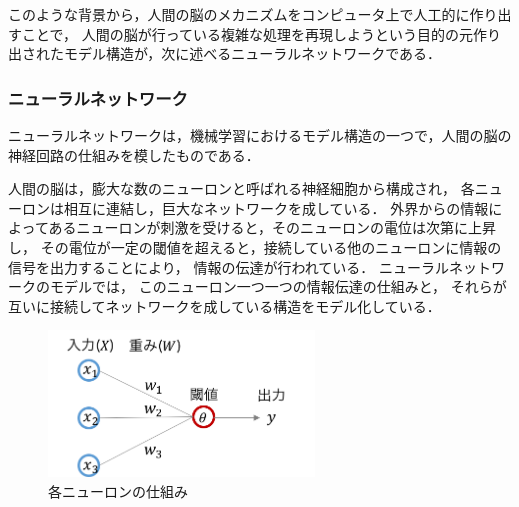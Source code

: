 このような背景から，人間の脳のメカニズムをコンピュータ上で人工的に作り出すことで，
人間の脳が行っている複雑な処理を再現しようという目的の元作り出されたモデル構造が，次に述べるニューラルネットワークである．


\subsubsection{ニューラルネットワーク}
ニューラルネットワークは，機械学習におけるモデル構造の一つで，人間の脳の神経回路の仕組みを模したものである．

人間の脳は，膨大な数のニューロンと呼ばれる神経細胞から構成され，
各ニューロンは相互に連結し，巨大なネットワークを成している．
外界からの情報によってあるニューロンが刺激を受けると，そのニューロンの電位は次第に上昇し，
その電位が一定の閾値を超えると，接続している他のニューロンに情報の信号を出力することにより，
情報の伝達が行われている．
ニューラルネットワークのモデルでは，
このニューロン一つ一つの情報伝達の仕組みと，
それらが互いに接続してネットワークを成している構造をモデル化している．

\begin{figure}[htb]
\begin{center}
\includegraphics[width=200pt]{./img/neuron.png}
\end{center}
\caption{各ニューロンの仕組み}
\label{fig:neuron}
\end{figure}

\begin{figure}[t]
\begin{center}
\hspace*{-40pt}
\end{center}
\end{figure}


